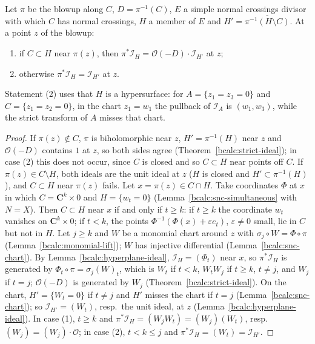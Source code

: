 \begin{theorem}
\label{bcalc:member-pullback}
\mixedleanok
Let \(\pi\) be the blowup along \(C\), \(D=\pi^{-1}(C)\), \(E\) a simple normal crossings divisor with which \(C\) has normal crossings, \(H\) a member of
\(E\) and \(H'=\overline{\pi^{-1}(H\setminus C)}\). At a point \(z\) of the blowup:
\begin{enumerate}
\item if \(C\subset H\) near \(\pi(z)\), then \(\pi^*\mathcal I_H=\mathcal O(-D)\cdot\mathcal I_{H'}\) at \(z\);
\item otherwise \(\pi^*\mathcal I_H=\mathcal I_{H'}\) at \(z\).
\end{enumerate}
Statement (2) uses that \(H\) is a hypersurface: for \(A=\{z_1=z_3=0\}\) and \(C=\{z_1=z_2=0\}\), in the chart \(z_1=w_1\) the pullback of
\(\mathcal I_A\) is \((w_1,w_3)\), while the strict transform of \(A\) misses that chart.
\end{theorem}
\begin{proof}
\mixedleanok
If \(\pi(z)\notin C\), \(\pi\) is biholomorphic near \(z\), \(H'=\pi^{-1}(H)\) near \(z\) and \(\mathcal O(-D)\) contains \(1\) at \(z\), so both sides agree
(Theorem~\ref{bcalc:strict-ideal}); in case (2) this does not occur, since \(C\) is closed and so \(C\subset H\) near points off \(C\). If \(\pi(z)\in C\setminus H\),
both ideals are the unit ideal at \(z\) (\(H\) is closed and \(H'\subset\pi^{-1}(H)\)), and \(C\subset H\) near \(\pi(z)\) fails. Let \(x=\pi(z)\in C\cap H\).
Take coordinates \(\Phi\) at \(x\) in which \(C=\mathbf C^k\times0\) and \(H=\{w_t=0\}\) (Lemma~\ref{bcalc:snc-simultaneous} with \(N=X\)). Then \(C\subset H\) near \(x\)
if and only if \(t\ge k\): if \(t\ge k\) the coordinate \(w_t\) vanishes on \(\mathbf C^k\times0\); if \(t<k\), the points \(\Phi^{-1}(\Phi(x)+\varepsilon e_t)\),
\(\varepsilon\ne0\) small, lie in \(C\) but not in \(H\). Let \(j\ge k\) and \(W\) be a monomial chart around \(z\) with \(\sigma_j\circ W=\Phi\circ\pi\)
(Lemma~\ref{bcalc:monomial-lift}); \(W\) has injective differential (Lemma~\ref{bcalc:snc-chart}). By Lemma~\ref{bcalc:hyperplane-ideal}, \(\mathcal I_H=(\Phi_t)\)
near \(x\), so \(\pi^*\mathcal I_H\) is generated by \(\Phi_t\circ\pi=\sigma_j(W)_t\), which is \(W_t\) if \(t<k\), \(W_tW_j\) if \(t\ge k\), \(t\ne j\), and \(W_j\)
if \(t=j\); \(\mathcal O(-D)\) is generated by \(W_j\) (Theorem~\ref{bcalc:strict-ideal}). On the chart, \(H'=\{W_t=0\}\) if \(t\ne j\) and \(H'\) misses the chart if
\(t=j\) (Lemma~\ref{bcalc:snc-chart}); so \(\mathcal I_{H'}=(W_t)\), resp.\ the unit ideal, at \(z\) (Lemma~\ref{bcalc:hyperplane-ideal}). In case (1), \(t\ge k\)
and \(\pi^*\mathcal I_H=(W_jW_t)=(W_j)(W_t)\), resp.\ \((W_j)=(W_j)\cdot\mathcal O\); in case (2), \(t<k\le j\) and \(\pi^*\mathcal I_H=(W_t)=\mathcal I_{H'}\).
\end{proof}

